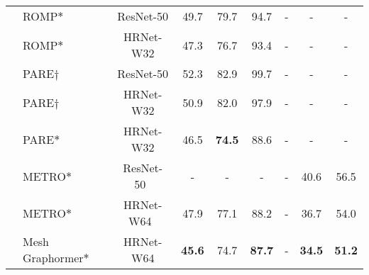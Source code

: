 \begin{table*}
{\begin{tabular}{llccccccc}
			& ROMP$\ast$~\citep{romp:sun2021monocular} &ResNet-50& 49.7 & 79.7 & 94.7 &- & -&-\\
			& ROMP$\ast$~\citep{romp:sun2021monocular} &HRNet-W32& 47.3 & 76.7 & 93.4 &- & -&-\\
			
	
            & PARE$\dagger$~\citep{pare:kocabas2021pare}  &ResNet-50& 52.3 & 82.9 & 99.7 & - & - & - \\
			& PARE$\dagger$~\citep{pare:kocabas2021pare}  &HRNet-W32& 50.9 & 82.0 & 97.9 & - & - & - \\
			& PARE$\ast$~\citep{pare:kocabas2021pare} &HRNet-W32& 46.5 & \textbf{74.5} & 88.6 & - & - & - \\
			
			& METRO$\ast$~\citep{metro:lin2021end} &ResNet-50~& - & - & - & - & 40.6 & 56.5 \\
			& METRO$\ast$~\citep{metro:lin2021end} &HRNet-W64~& 47.9 & 77.1 & 88.2 & - & 36.7 & 54.0 \\
		
			& Mesh Graphormer$\ast$~\citep{meshgrahormer:lin2021mesh} &HRNet-W64& \textbf{45.6 }& 74.7 &\textbf{ 87.7} & - & \textbf{34.5} & \textbf{51.2 }\\
			
			\midrule
			

\end{tabular}}
\end{table*}
